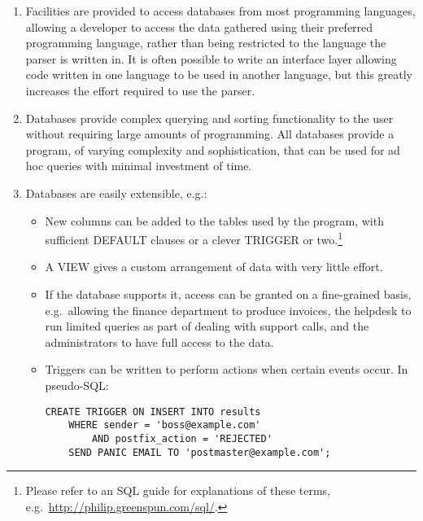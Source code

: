 \begin{enumerate}

    \item Facilities are provided to access databases from most programming
        languages, allowing a developer to access the data gathered using
        their preferred programming language, rather than being restricted
        to the language the parser is written in.  It is often possible to
        write an interface layer allowing code written in one language to
        be used in another language, but this greatly increases the effort
        required to use the parser.

    \item Databases provide complex querying and sorting functionality to
        the user without requiring large amounts of programming.  All
        databases provide a program, of varying complexity and
        sophistication, that can be used for ad hoc queries with minimal
        investment of time.

    \item Databases are easily extensible, e.g.:

        \begin{itemize}

            \item New columns can be added to the tables used by the
                program, with sufficient DEFAULT clauses or a clever
                TRIGGER or two.\footnote{Please refer to an \gls{SQL} guide
                for explanations of these terms, e.g.\
                \url{http://philip.greenspun.com/sql/}.}

            \item A VIEW gives a custom arrangement of data with very
                little effort.

            \item If the database supports it, access can be granted on a
                fine-grained basis, e.g.\ allowing the finance department
                to produce invoices, the helpdesk to run limited queries as
                part of dealing with support calls, and the administrators
                to have full access to the data.

            \item Triggers can be written to perform actions when certain
                events occur.  In pseudo-\gls{SQL}\@:

\begin{verbatim}
CREATE TRIGGER ON INSERT INTO results
    WHERE sender = 'boss@example.com'
        AND postfix_action = 'REJECTED'
    SEND PANIC EMAIL TO 'postmaster@example.com';
\end{verbatim}


\end{itemize}
\end{enumerate}

